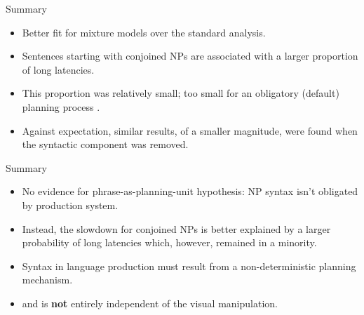 \begin{frame}{Summary}
	\begin{itemize}
		\item Better fit for mixture models over the standard analysis.
		\item Sentences starting with conjoined NPs are associated with a larger proportion of long latencies.
		\item This proportion was relatively small; too small for an obligatory (default) planning process \parencite{martin2010planning}.
		\item Against expectation, similar results, of a smaller magnitude, were found when the syntactic component was removed.
	\end{itemize}
	
\end{frame}


\begin{frame}{Summary}
	\begin{itemize}
		\item No evidence for phrase-as-planning-unit hypothesis: NP syntax isn't obligated by production system.
		\item Instead, the slowdown for conjoined NPs is better explained by a larger probability of long latencies which, however, remained in a minority.
		\item Syntax in language production must result from a non-deterministic planning mechanism.
		\item and is \textbf{not} entirely independent of the visual manipulation.
	\end{itemize}
\end{frame}



\begin{comment}
\begin{frame}{Alternative explanations}
	\begin{itemize}
		\item[i.] Lexical preplanning: avoidance of intra-sentential pausing.
		\item[ii.] Syntactic correction of incorrectly activated NP syntax.
		\item[iii.] Both: use of syntactic route, instead of a lexical route, leads to a slowdown in conjoined NPs but not in simple NPs. 
	\end{itemize}
\end{frame}
\end{comment}
